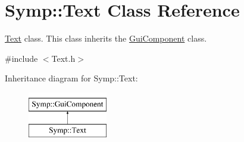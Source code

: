 \hypertarget{class_symp_1_1_text}{\section{Symp\-:\-:Text Class Reference}
\label{class_symp_1_1_text}
}


\hyperlink{class_symp_1_1_text}{Text} class. This class inherits the \hyperlink{class_symp_1_1_gui_component_a22124675c2976983ac18374f81cc3fb3}{Gui\-Component} class.  




{\ttfamily \#include $<$Text.\-h$>$}

Inheritance diagram for Symp\-:\-:Text\-:\begin{figure}[H]
\begin{center}
\leavevmode
\includegraphics[height=2.000000cm]{class_symp_1_1_text}
\end{center}
\end{figure}
